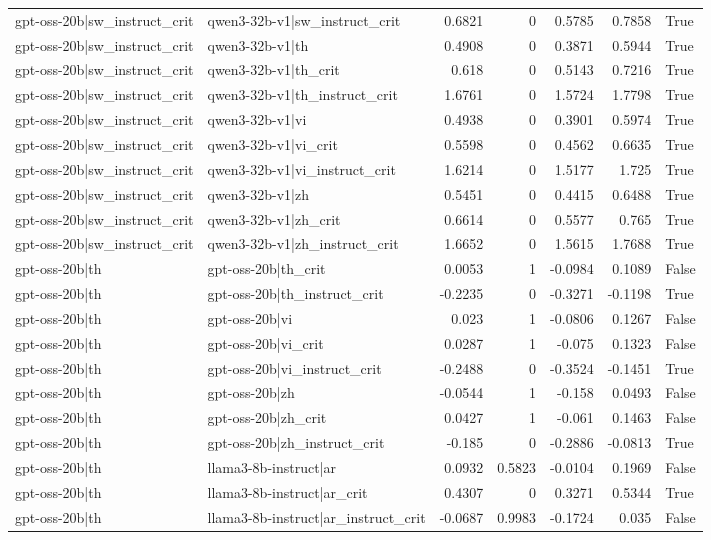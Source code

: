 \begin{table}
\begin{tabular}{l l r r r r l}
gpt-oss-20b|sw_instruct_crit & qwen3-32b-v1|sw_instruct_crit & 0.6821 & 0 & 0.5785 & 0.7858 & True \\
gpt-oss-20b|sw_instruct_crit & qwen3-32b-v1|th & 0.4908 & 0 & 0.3871 & 0.5944 & True \\
gpt-oss-20b|sw_instruct_crit & qwen3-32b-v1|th_crit & 0.618 & 0 & 0.5143 & 0.7216 & True \\
gpt-oss-20b|sw_instruct_crit & qwen3-32b-v1|th_instruct_crit & 1.6761 & 0 & 1.5724 & 1.7798 & True \\
gpt-oss-20b|sw_instruct_crit & qwen3-32b-v1|vi & 0.4938 & 0 & 0.3901 & 0.5974 & True \\
gpt-oss-20b|sw_instruct_crit & qwen3-32b-v1|vi_crit & 0.5598 & 0 & 0.4562 & 0.6635 & True \\
gpt-oss-20b|sw_instruct_crit & qwen3-32b-v1|vi_instruct_crit & 1.6214 & 0 & 1.5177 & 1.725 & True \\
gpt-oss-20b|sw_instruct_crit & qwen3-32b-v1|zh & 0.5451 & 0 & 0.4415 & 0.6488 & True \\
gpt-oss-20b|sw_instruct_crit & qwen3-32b-v1|zh_crit & 0.6614 & 0 & 0.5577 & 0.765 & True \\
gpt-oss-20b|sw_instruct_crit & qwen3-32b-v1|zh_instruct_crit & 1.6652 & 0 & 1.5615 & 1.7688 & True \\
gpt-oss-20b|th & gpt-oss-20b|th_crit & 0.0053 & 1 & -0.0984 & 0.1089 & False \\
gpt-oss-20b|th & gpt-oss-20b|th_instruct_crit & -0.2235 & 0 & -0.3271 & -0.1198 & True \\
gpt-oss-20b|th & gpt-oss-20b|vi & 0.023 & 1 & -0.0806 & 0.1267 & False \\
gpt-oss-20b|th & gpt-oss-20b|vi_crit & 0.0287 & 1 & -0.075 & 0.1323 & False \\
gpt-oss-20b|th & gpt-oss-20b|vi_instruct_crit & -0.2488 & 0 & -0.3524 & -0.1451 & True \\
gpt-oss-20b|th & gpt-oss-20b|zh & -0.0544 & 1 & -0.158 & 0.0493 & False \\
gpt-oss-20b|th & gpt-oss-20b|zh_crit & 0.0427 & 1 & -0.061 & 0.1463 & False \\
gpt-oss-20b|th & gpt-oss-20b|zh_instruct_crit & -0.185 & 0 & -0.2886 & -0.0813 & True \\
gpt-oss-20b|th & llama3-8b-instruct|ar & 0.0932 & 0.5823 & -0.0104 & 0.1969 & False \\
gpt-oss-20b|th & llama3-8b-instruct|ar_crit & 0.4307 & 0 & 0.3271 & 0.5344 & True \\
gpt-oss-20b|th & llama3-8b-instruct|ar_instruct_crit & -0.0687 & 0.9983 & -0.1724 & 0.035 & False \\

\end{tabular}
\end{table}
